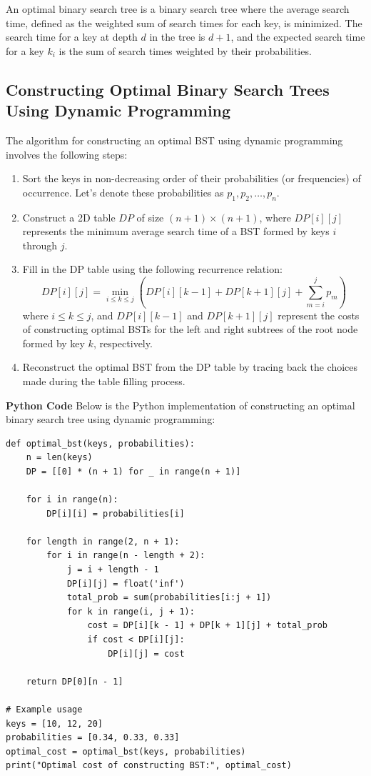\documentclass[12pt]{book} %
\begin{document}
An optimal binary search tree is a binary search tree where the average search time, defined as the weighted sum of search times for each key, is minimized. The search time for a key at depth \(d\) in the tree is \(d+1\), and the expected search time for a key \(k_i\) is the sum of search times weighted by their probabilities.

\subsection{Constructing Optimal Binary Search Trees Using Dynamic Programming}

The algorithm for constructing an optimal BST using dynamic programming involves the following steps:

\begin{enumerate}
    \item Sort the keys in non-decreasing order of their probabilities (or frequencies) of occurrence. Let's denote these probabilities as \( p_1, p_2, \ldots, p_n \).
    
    \item Construct a 2D table \( DP \) of size \( (n+1) \times (n+1) \), where \( DP[i][j] \) represents the minimum average search time of a BST formed by keys \( i \) through \( j \).
    
    \item Fill in the DP table using the following recurrence relation:
    \[
    DP[i][j] = \min_{i \leq k \leq j} \left( DP[i][k-1] + DP[k+1][j] + \sum_{m=i}^{j} p_m \right)
    \]
    where \( i \leq k \leq j \), and \( DP[i][k-1] \) and \( DP[k+1][j] \) represent the costs of constructing optimal BSTs for the left and right subtrees of the root node formed by key \( k \), respectively.
    
    \item Reconstruct the optimal BST from the DP table by tracing back the choices made during the table filling process.
\end{enumerate}
\FloatBarrier
\textbf{Python Code}
\FloatBarrier
Below is the Python implementation of constructing an optimal binary search tree using dynamic programming:
\FloatBarrier
\begin{lstlisting}
def optimal_bst(keys, probabilities):
    n = len(keys)
    DP = [[0] * (n + 1) for _ in range(n + 1)]

    for i in range(n):
        DP[i][i] = probabilities[i]

    for length in range(2, n + 1):
        for i in range(n - length + 2):
            j = i + length - 1
            DP[i][j] = float('inf')
            total_prob = sum(probabilities[i:j + 1])
            for k in range(i, j + 1):
                cost = DP[i][k - 1] + DP[k + 1][j] + total_prob
                if cost < DP[i][j]:
                    DP[i][j] = cost

    return DP[0][n - 1]

# Example usage
keys = [10, 12, 20]
probabilities = [0.34, 0.33, 0.33]
optimal_cost = optimal_bst(keys, probabilities)
print("Optimal cost of constructing BST:", optimal_cost)
\end{lstlisting}
\end{document}
